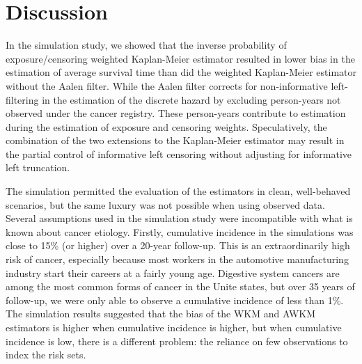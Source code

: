 \documentclass[
  11pt,
]{article}
\begin{document}
\hypertarget{discussion}{%
\section{Discussion}\label{discussion}}

In the simulation study, we showed that the inverse probability of
exposure/censoring weighted Kaplan-Meier estimator resulted in lower
bias in the estimation of average survival time than did the weighted
Kaplan-Meier estimator without the Aalen filter. While the Aalen filter
corrects for non-informative left-filtering in the estimation of the
discrete hazard by excluding person-years not observed under the cancer
registry. These person-years contribute to estimation during the
estimation of exposure and censoring weights. Speculatively, the
combination of the two extensions to the Kaplan-Meier estimator may
result in the partial control of informative left censoring without
adjusting for informative left truncation.

The simulation permitted the evaluation of the estimators in clean,
well-behaved scenarios, but the same luxury was not possible when using
observed data. Several assumptions used in the simulation study were
incompatible with what is known about cancer etiology. Firstly,
cumulative incidence in the simulations was close to 15\% (or higher)
over a 20-year follow-up. This is an extraordinarily high risk of
cancer, especially because most workers in the automotive manufacturing
industry start their careers at a fairly young age. Digestive system
cancers are among the most common forms of cancer in the Unite states,
but over 35 years of follow-up, we were only able to observe a
cumulative incidence of less than 1\%. The simulation results suggested
that the bias of the WKM and AWKM estimators is higher when cumulative
incidence is higher, but when cumulative incidence is low, there is a
different problem: the reliance on few observations to index the risk
sets.
\end{document}
